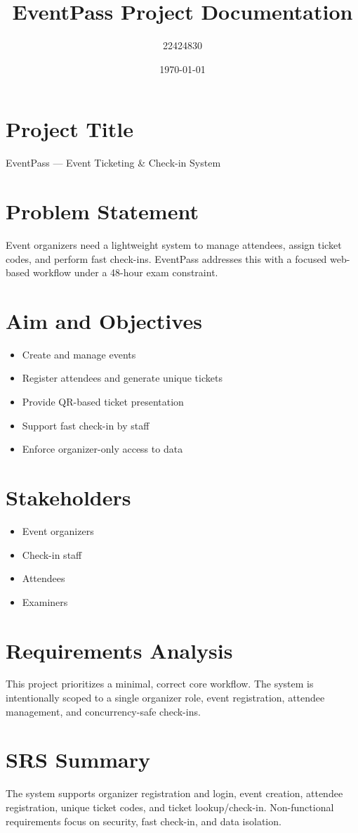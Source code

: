 \documentclass[11pt]{article}
\begin{document}
\title{EventPass Project Documentation}
\author{22424830}
\date{\today}
\maketitle
\tableofcontents
\section{Project Title}
EventPass — Event Ticketing \& Check-in System
\section{Problem Statement}
Event organizers need a lightweight system to manage attendees, assign ticket codes, and perform fast check-ins. EventPass addresses this with a focused web-based workflow under a 48-hour exam constraint.
\section{Aim and Objectives}
\begin{itemize}[leftmargin=1.5em]
  \item Create and manage events
  \item Register attendees and generate unique tickets
  \item Provide QR-based ticket presentation
  \item Support fast check-in by staff
  \item Enforce organizer-only access to data
\end{itemize}
\section{Stakeholders}
\begin{itemize}[leftmargin=1.5em]
  \item Event organizers
  \item Check-in staff
  \item Attendees
  \item Examiners
\end{itemize}
\section{Requirements Analysis}
This project prioritizes a minimal, correct core workflow. The system is intentionally scoped to a single organizer role, event registration, attendee management, and concurrency-safe check-ins.
\section{SRS Summary}
The system supports organizer registration and login, event creation, attendee registration, unique ticket codes, and ticket lookup/check-in. Non-functional requirements focus on security, fast check-in, and data isolation.
\end{document}
